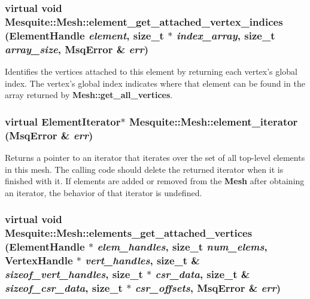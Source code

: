 \documentclass[letter]{report}
\begin{document}
\subsubsection{\setlength{\rightskip}{0pt plus 5cm}virtual void Mesquite::Mesh::element\_\-get\_\-attached\_\-vertex\_\-indices (Element\-Handle {\em element}, size\_\-t $\ast$ {\em index\_\-array}, size\_\-t {\em array\_\-size}, {\bf Msq\-Error} \& {\em err})\hspace{0.3cm}{\tt  [pure virtual]}}\label{classMesquite_1_1Mesh_a19}


Identifies the vertices attached to this element by returning each vertex's global index. The vertex's global index indicates where that element can be found in the array returned by {\bf Mesh::get\_\-all\_\-vertices}. 

\subsubsection{\setlength{\rightskip}{0pt plus 5cm}virtual Element\-Iterator$\ast$ Mesquite::Mesh::element\_\-iterator ({\bf Msq\-Error} \& {\em err})\hspace{0.3cm}{\tt  [pure virtual]}}\label{classMesquite_1_1Mesh_a6}


Returns a pointer to an iterator that iterates over the set of all top-level elements in this mesh. The calling code should delete the returned iterator when it is finished with it. If elements are added or removed from the {\bf Mesh} after obtaining an iterator, the behavior of that iterator is undefined. 

\subsubsection{\setlength{\rightskip}{0pt plus 5cm}virtual void Mesquite::Mesh::elements\_\-get\_\-attached\_\-vertices (Element\-Handle $\ast$ {\em elem\_\-handles}, size\_\-t {\em num\_\-elems}, Vertex\-Handle $\ast$ {\em vert\_\-handles}, size\_\-t \& {\em sizeof\_\-vert\_\-handles}, size\_\-t $\ast$ {\em csr\_\-data}, size\_\-t \& {\em sizeof\_\-csr\_\-data}, size\_\-t $\ast$ {\em csr\_\-offsets}, {\bf Msq\-Error} \& {\em err})\hspace{0.3cm}{\tt  [pure virtual]}}\label{classMesquite_1_1Mesh_a18}
\end{document}
